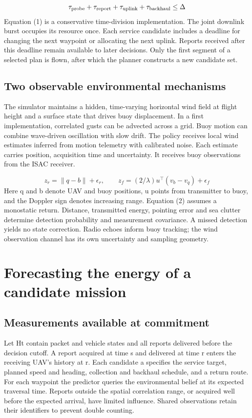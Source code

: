 \documentclass[journal]{IEEEtran}
\begin{document}
\begin{equation}\tau_{\rm probe}+\tau_{\rm report}+\tau_{\rm uplink}+\tau_{\rm backhaul}\leq\Delta\end{equation}
Equation (1) is a conservative time-division implementation. The joint downlink burst occupies its resource once. Each service candidate includes a deadline for changing the next waypoint or allocating the next uplink. Reports received after this deadline remain available to later decisions. Only the first segment of a selected plan is flown, after which the planner constructs a new candidate set.

\subsection{Two observable environmental mechanisms}
The simulator maintains a hidden, time-varying horizontal wind field at flight height and a surface state that drives buoy displacement. In a first implementation, correlated gusts can be advected across a grid. Buoy motion can combine wave-driven oscillation with slow drift. The policy receives local wind estimates inferred from motion telemetry with calibrated noise. Each estimate carries position, acquisition time and uncertainty. It receives buoy observations from the ISAC receiver.

\begin{equation}z_r=\|q-b\|+\epsilon_r,\qquad z_f=(2/\lambda)u^\top(v_b-v_q)+\epsilon_f\end{equation}
Here q and b denote UAV and buoy positions, u points from transmitter to buoy, and the Doppler sign denotes increasing range. Equation (2) assumes a monostatic return. Distance, transmitted energy, pointing error and sea clutter determine detection probability and measurement covariance. A missed detection yields no state correction. Radio echoes inform buoy tracking; the wind observation channel has its own uncertainty and sampling geometry.

\section{Forecasting the energy of a candidate mission}
\subsection{Measurements available at commitment}
Let Ht contain packet and vehicle states and all reports delivered before the decision cutoff. A report acquired at time s and delivered at time r enters the receiving UAV's history at r. Each candidate a specifies the service target, planned speed and heading, collection and backhaul schedule, and a return route. For each waypoint the predictor queries the environmental belief at its expected traversal time. Reports outside the spatial correlation range, or acquired well before the expected arrival, have limited influence. Shared observations retain their identifiers to prevent double counting.
\end{document}
